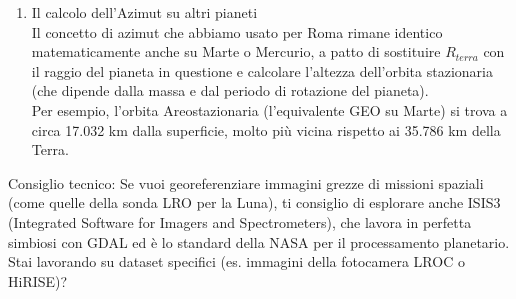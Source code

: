 \documentclass[a4paper,14pt]{article}
\begin{document}
\begin{enumerate}
Per la Luna, fai attenzione al sistema di coordinate. Esistono due standard principali:\\
\begin{itemize}
\item Mean Earth/Polar Axis: Spesso usato per i dati di cartografia globale.\\
\item Principal Axis (PA): Più preciso per la dinamica orbitale.\\
\end{itemize}
Puoi trovare le definizioni ufficiali dei codici EPSG per i corpi planetari sul portale IAU WGCCRE o utilizzare i codici definiti dal USGS Astrogeology Center.
\item Il calcolo dell'Azimut su altri pianeti\\
Il concetto di azimut che abbiamo usato per Roma rimane identico matematicamente anche su Marte o Mercurio, a patto di sostituire \(R_{terra}\) con il raggio del pianeta in questione e calcolare l'altezza dell'orbita stazionaria (che dipende dalla massa e dal periodo di rotazione del pianeta).\\
Per esempio, l'orbita Areostazionaria (l'equivalente GEO su Marte) si trova a circa 17.032 km dalla superficie, molto più vicina rispetto ai 35.786 km della Terra.
\end{enumerate}
Consiglio tecnico: Se vuoi georeferenziare immagini grezze di missioni spaziali (come quelle della sonda LRO per la Luna), ti consiglio di esplorare anche ISIS3 (Integrated Software for Imagers and Spectrometers), che lavora in perfetta simbiosi con GDAL ed è lo standard della NASA per il processamento planetario.\\
Stai lavorando su dataset specifici (es. immagini della fotocamera LROC o HiRISE)?\\
\end{document}
